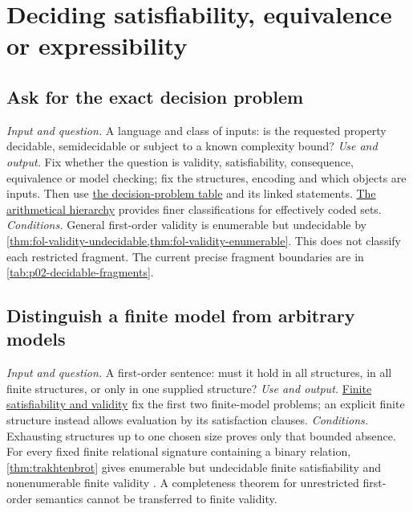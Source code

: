 \section{Deciding satisfiability, equivalence or expressibility}
\label{sec:p14-finder-deciding}

\subsection{Ask for the exact decision problem}
\label{sec:p14-finder-decision-input}
\textit{Input and question.} A language and class of inputs: is the requested
property decidable, semidecidable or subject to a known complexity bound?
\textit{Use and output.} Fix whether the question is validity, satisfiability,
consequence, equivalence or model checking; fix the structures, encoding and
which objects are inputs. Then use
\hyperref[sec:p14-decision-table]{the decision-problem table} and its linked
statements. \hyperref[sec:decision-hierarchy-02]{The arithmetical hierarchy}
provides finer classifications for effectively coded sets.
\textit{Conditions.} General first-order validity is enumerable but
undecidable by \cref{thm:fol-validity-undecidable,thm:fol-validity-enumerable}.
This does not classify each restricted fragment. The current precise
fragment boundaries are in \cref{tab:p02-decidable-fragments}.

\subsection{Distinguish a finite model from arbitrary models}
\label{sec:p14-finder-finite-models}
\textit{Input and question.} A first-order sentence: must it hold in all
structures, in all finite structures, or only in one supplied structure?
\textit{Use and output.}
\hyperref[def:p09-finite-validity]{Finite satisfiability and validity}
fix the first two finite-model problems; an explicit finite structure instead
allows evaluation by its satisfaction clauses.
\textit{Conditions.} Exhausting structures up to one chosen size proves only
that bounded absence. For every fixed finite relational signature containing
a binary relation, \cref{thm:trakhtenbrot} gives enumerable but undecidable
finite satisfiability and nonenumerable finite validity
\cite{Trakhtenbrot1950}. A completeness theorem for unrestricted first-order
semantics cannot be transferred to finite validity.


